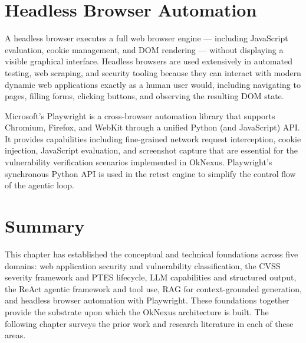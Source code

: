 \section{Headless Browser Automation}

A headless browser executes a full web browser engine --- including JavaScript evaluation, cookie management, and DOM rendering --- without displaying a visible graphical interface. Headless browsers are used extensively in automated testing, web scraping, and security tooling because they can interact with modern dynamic web applications exactly as a human user would, including navigating to pages, filling forms, clicking buttons, and observing the resulting DOM state.

Microsoft's Playwright \cite{playwright_microsoft} is a cross-browser automation library that supports Chromium, Firefox, and WebKit through a unified Python (and JavaScript) API. It provides capabilities including fine-grained network request interception, cookie injection, JavaScript evaluation, and screenshot capture that are essential for the vulnerability verification scenarios implemented in OkNexus. Playwright's synchronous Python API is used in the retest engine to simplify the control flow of the agentic loop.

\section{Summary}

This chapter has established the conceptual and technical foundations across five domains: web application security and vulnerability classification, the CVSS severity framework and PTES lifecycle, LLM capabilities and structured output, the ReAct agentic framework and tool use, RAG for context-grounded generation, and headless browser automation with Playwright. These foundations together provide the substrate upon which the OkNexus architecture is built. The following chapter surveys the prior work and research literature in each of these areas.
